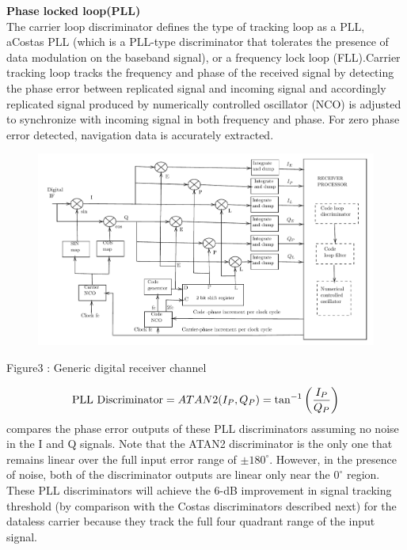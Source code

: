\textbf{Phase locked loop(PLL)}\\
The carrier loop discriminator defines the type of tracking loop as a PLL, aCostas PLL (which is a PLL-type discriminator that tolerates the presence of data modulation on the baseband signal), or a frequency lock loop (FLL).Carrier tracking loop tracks the frequency and phase of the received signal by detecting the phase error between replicated signal and incoming signal and accordingly replicated signal produced by numerically controlled oscillator (NCO) is adjusted to synchronize with incoming signal in both frequency and phase. For zero phase error detected, navigation data is accurately extracted. 
\begin{figure}[!ht]%
\includegraphics[scale=0.5]{figs/block3}
\end{figure}
\begin{center}
Figure3 : Generic digital receiver channel
\end{center}
\begin{align}
\text{PLL Discriminator} =ATAN2(I_P,Q_P) = \tan^{-1}\left(\frac{I_P}{Q_P}\right)
\end{align}
compares the phase error outputs of these PLL discriminators assuming no noise in the I and Q signals. Note that the ATAN2 discriminator is the only one that remains linear over the full input error range of $\pm180^{\circ}$. However, in the presence of noise, both of the discriminator outputs are linear only near the $0^{\circ}$ region. These PLL discriminators will achieve the 6-dB improvement in signal tracking threshold (by comparison with the Costas discriminators described next) for the dataless carrier because they track the full four quadrant range of the input signal.\\
